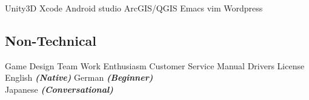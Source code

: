 \documentclass[a4paper]{deedy-resume} %
\begin{document}
\begin{minipage}[t]{0.33\textwidth}
Unity3D \textbullet{} Xcode \textbullet{} Android studio \textbullet{} ArcGIS/QGIS \textbullet{}
Emacs \textbullet{} vim \textbullet{} Wordpress \\

\sectionspace

\subsection{Non-Technical}
Game Design \textbullet{} Team Work \textbullet{} Enthusiasm \textbullet{} Customer Service \textbullet{} Manual Drivers License\\
English {\footnotesize \textit{\textbf{(Native)}}} \textbullet{} German {\footnotesize \textit{\textbf{(Beginner)}}} \textbullet{} \\
Japanese {\footnotesize \textit{\textbf{(Conversational)}}} \\

\sectionspace %


\end{minipage} %
\hfill
%
%
\end{document}
